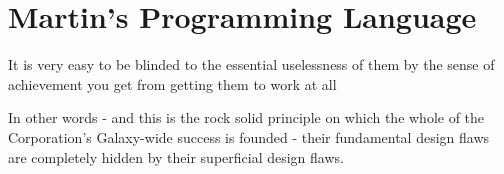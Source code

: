 \chapter{Martin's Programming Language}
It is very easy to be blinded to the essential uselessness of them by the sense of achievement you get from getting them to work at all

In other words - and this is the rock solid principle on which the whole of the Corporation's Galaxy-wide success is founded - their fundamental design flaws are completely hidden by their superficial design flaws. 


